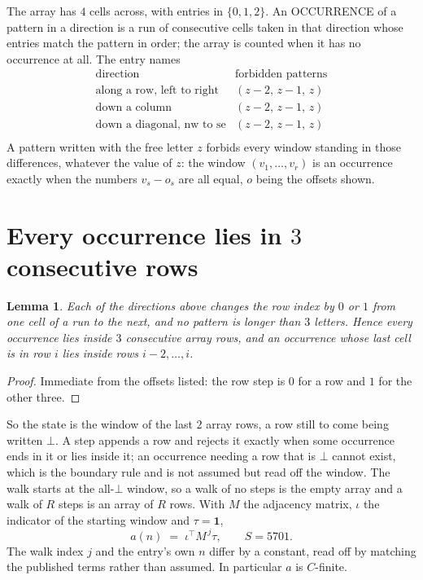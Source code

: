 \documentclass[11pt,a4paper]{article}
\theoremstyle{plain}
\newtheorem{lemma}[theorem]{Lemma}
\theoremstyle{definition}
\begin{document}
The array has $4$ cells across, with entries in $\{0,1,2\}$. An OCCURRENCE of a pattern in a
direction is a run of consecutive cells taken in that direction whose entries match the pattern
in order; the array is counted when it has no occurrence at all. The entry names
\[
\begin{array}{ll}
\text{direction} & \text{forbidden patterns} \\[2pt]
\text{along a row, left to right} & (z-2,\,z-1,\,z) \\
\text{down a column} & (z-2,\,z-1,\,z) \\
\text{down a diagonal, nw to se} & (z-2,\,z-1,\,z) \\
\end{array}
\]
 A pattern written with the free letter $z$ forbids every window standing in those differences, whatever the value of $z$: the window $(v_1,\dots,v_r)$ is an occurrence exactly when the numbers $v_s-o_s$ are all equal, $o$ being the offsets shown.

\section{Every occurrence lies in $3$ consecutive rows}

\begin{lemma}\label{lem:win}
Each of the directions above changes the row index by $0$ or $1$ from one cell of a run to the
next, and no pattern is longer than $3$ letters. Hence every occurrence lies inside $3$
consecutive array rows, and an occurrence whose last cell is in row $i$ lies inside rows
$i-2,\dots,i$.
\end{lemma}

\begin{proof}
Immediate from the offsets listed: the row step is $0$ for a row and $1$ for the other three.
\end{proof}

So the state is the window of the last $2$ array rows, a row still to come being written
$\bot$. A step appends a row and rejects it exactly when some occurrence ends in it or lies
inside it; an occurrence needing a row that is $\bot$ cannot exist, which is the boundary rule
and is not assumed but read off the window. The walk starts at the all-$\bot$ window, so a walk
of no steps is the empty array and a walk of $R$ steps is an array of $R$ rows. With $M$ the
adjacency matrix, $\iota$ the indicator of the starting window and $\tau=\mathbf{1}$,
\[
a(n)\;=\;\iota^{\!\top}M^{\,j}\tau ,\qquad S=5701.
\]
The walk index $j$ and the entry's own $n$ differ by a constant, read off by matching the
published terms rather than assumed. In particular $a$ is $C$-finite.
\end{document}

